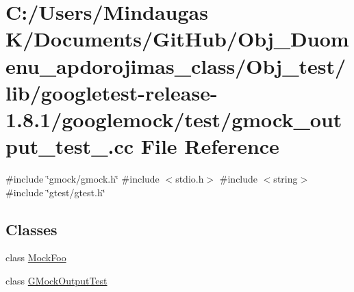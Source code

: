 \hypertarget{_obj__test_2lib_2googletest-release-1_88_81_2googlemock_2test_2gmock__output__test___8cc}{}\section{C\+:/\+Users/\+Mindaugas K/\+Documents/\+Git\+Hub/\+Obj\+\_\+\+Duomenu\+\_\+apdorojimas\+\_\+class/\+Obj\+\_\+test/lib/googletest-\/release-\/1.8.1/googlemock/test/gmock\+\_\+output\+\_\+test\+\_\+.cc File Reference}
\label{_obj__test_2lib_2googletest-release-1_88_81_2googlemock_2test_2gmock__output__test___8cc}
{\ttfamily \#include \char`\"{}gmock/gmock.\+h\char`\"{}}\newline
{\ttfamily \#include $<$stdio.\+h$>$}\newline
{\ttfamily \#include $<$string$>$}\newline
{\ttfamily \#include \char`\"{}gtest/gtest.\+h\char`\"{}}\newline
\subsection*{Classes}
\begin{DoxyCompactItemize}
\item 
class \mbox{\hyperlink{class_mock_foo}{Mock\+Foo}}
\item 
class \mbox{\hyperlink{class_g_mock_output_test}{G\+Mock\+Output\+Test}}
\end{DoxyCompactItemize}
